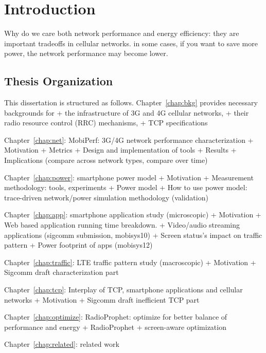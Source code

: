 \chapter{Introduction}   \label{chap:intro}

Why do we care both network performance and energy efficiency: they are important tradeoffs in cellular networks. in some cases, if you want to save more power, the network performance may become lower.

\section{Thesis Organization}

This dissertation is structured as follows. Chapter~\ref{chap:bkg} provides necessary backgrounds for 
+ the infrastructure of 3G and 4G cellular networks, 
+ their radio resource control (RRC) mechanisms, 
+ TCP specifications

Chapter~\ref{chap:net}: MobiPerf: 3G/4G network performance characterization
	+ Motivation
	+ Metrics
	+ Design and implementation of tools
	+ Results
	+ Implications (compare across network types, compare over time)
	
Chapter~\ref{chap:power}: smartphone power model
	+ Motivation
	+ Measurement methodology: tools, experiments
	+ Power model
	+ How to use power model: trace-driven network/power simulation methodology (validation)
	
Chapter~\ref{chap:app}: smartphone application study (microscopic)
	+ Motivation
	+ Web based application running time breakdown.
	+ Video/audio streaming applications (sigcomm submission, mobisys10)
	+ Screen status's impact on traffic pattern
	+ Power footprint of apps (mobisys12)
	
Chapter~\ref{chap:traffic}: LTE traffic pattern study (macroscopic)
	+ Motivation
	+ Sigcomm draft characterization part

Chapter~\ref{chap:tcp}: Interplay of TCP, smartphone applications and cellular networks
	+ Motivation
	+ Sigcomm draft inefficient TCP part
		
Chapter~\ref{chap:optimize}: RadioProphet: optimize for better balance of performance and energy
	+ RadioProphet
	+ screen-aware optimization
	
Chapter~\ref{chap:related}: related work